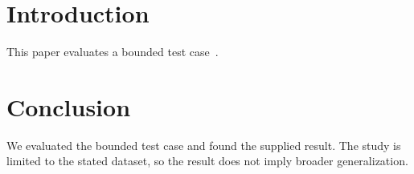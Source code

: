 \documentclass{article}
\begin{document}
\section{Introduction}
This paper evaluates a bounded test case~\cite{approved2026}.
\section{Conclusion}
We evaluated the bounded test case and found the supplied result. The study is limited to the stated dataset, so the result does not imply broader generalization.

\end{document}
